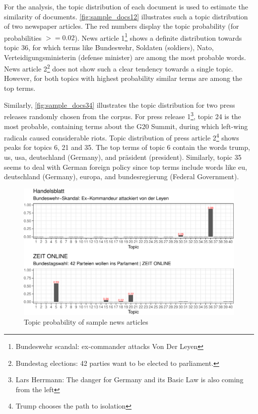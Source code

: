 \documentclass[
  12pt,
]{article}
\begin{document}
For the analysis, the topic distribution of each document is used to
estimate the similarity of documents. \autoref{fig:sample_docs12}
illustrates such a topic distribution of two newspaper articles. The red
numbers display the topic probability (for probabilities \(>= 0.02\)).
News article 1\footnote{Bundeswehr scandal: ex-commander attacks Von Der
  Leyen} shows a definite distribution towards topic 36, for which terms
like Bundeswehr, Soldaten (soldiers), Nato, Verteidigungsministerin
(defense minister) are among the most probable words. News article
2\footnote{Bundestag elections: 42 parties want to be elected to
  parliament.} does not show such a clear tendency towards a single
topic. However, for both topics with highest probability similar terms
are among the top terms.

Similarly, \autoref{fig:sample_docs34} illustrates the topic
distribution for two press releases randomly chosen from the corpus. For
press release 1\footnote{Lars Herrmann: The danger for Germany and its
  Basic Law is also coming from the left}, topic 24 is the most
probable, containing terms about the G20 Summit, during which left-wing
radicals caused considerable riots. Topic distribution of press article
2\footnote{Trump chooses the path to isolation} shows peaks for topics
6, 21 and 35. The top terms of topic 6 contain the words trump, us, usa,
deutschland (Germany), and präsident (president). Similarly, topic 35
seems to deal with German foreign policy since top terms include words
like eu, deutschland (Germany), europa, and bundesregierung (Federal
Government).

\begin{figure}

{\centering \includegraphics[width=0.9\linewidth]{chap1_files/figure-latex/News articles sample documents-1} 

}

\caption{Topic probability of sample news articles \label{fig:sample_docs12}}\label{fig:News articles sample documents}
\end{figure}
\end{document}
